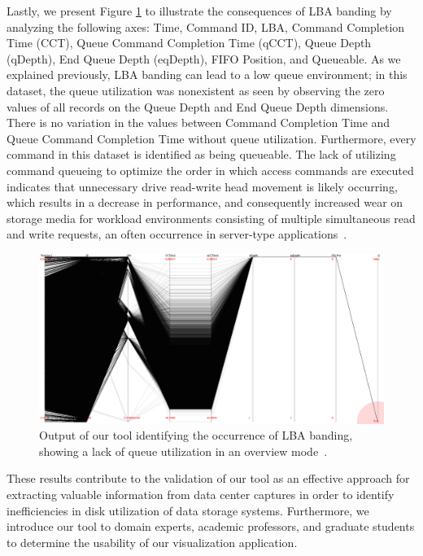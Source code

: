 \documentclass[12pt]{ucthesis}
\begin{document}
Lastly, we present Figure \ref{fig:no_queue} to illustrate the consequences of LBA banding by analyzing the following axes: Time, Command ID, LBA, Command Completion Time (CCT), Queue Command Completion Time (qCCT), Queue Depth (qDepth), End Queue Depth (eqDepth), FIFO Position, and Queueable. As we explained previously, LBA banding can lead to a low queue environment; in this dataset, the queue utilization was nonexistent as seen by observing the zero values of all records on the Queue Depth and End Queue Depth dimensions. There is no variation in the values between Command Completion Time and Queue Command Completion Time without queue utilization. Furthermore, every command in this dataset is identified as being queueable. The lack of utilizing command queueing to optimize the order in which access commands are executed indicates that unnecessary drive read-write head movement is likely occurring, which results in a decrease in performance, and consequently increased wear on storage media for workload environments consisting of multiple simultaneous read and write requests, an often occurrence in server-type applications~\cite{ncq:whitepaper}.

\begin{figure}[htb!]
 \centering
 \includegraphics[width=\textwidth]{images/no_queue.jpg}
 \caption[Output of our tool identifying the occurrence of LBA banding.]{Output of our tool identifying the occurrence of LBA banding, showing a lack of queue utilization in an overview mode~\cite{internal:collab}.}
 \label{fig:no_queue}
\end{figure}

These results contribute to the validation of our tool as an effective approach for extracting valuable information from data center captures in order to identify inefficiencies in disk utilization of data storage systems. Furthermore, we introduce our tool to domain experts, academic professors, and graduate students to determine the usability of our visualization application.
\end{document}
